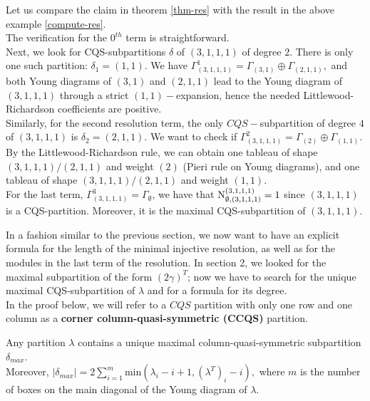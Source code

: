 \documentclass[main.tex]{subfiles}
\begin{document}
\begin{ex}
    \label{ex-resolution-proof-nr}
    Let us compare the claim in theorem \ref{thm-res} with the result in the above example \ref{compute-res}.  \\

    The verification for the $0^{th}$ term is straightforward. \\ 
    
    Next, we look for CQS-subpartitions $\delta$ of $(3,1,1,1)$ of degree $2.$ There is only one such partition: $\delta_1=(1,1).$ We have $\Gamma_{(3,1,1,1)}^1 = \Gamma_{(3,1)}\oplus \Gamma_{(2,1,1)},$ and both Young diagrams of $(3,1)$ and $(2,1,1)$ lead to the Young diagram of $(3,1,1,1)$ through a strict $(1,1)-$expansion, hence the needed Littlewood-Richardson coefficients are positive. \\ 
    
    Similarly, for the second resolution term, the only $CQS-$subpartition of degree $4$ of $(3,1,1,1)$ is $\delta_2 = (2,1,1)$. We want to check if $\Gamma_{(3,1,1,1)}^2 = \Gamma_{(2)} \oplus \Gamma_{(1,1)}$. By the Littlewood-Richardson rule, we can obtain one tableau of shape $(3,1,1,1)/(2,1,1)$ and weight $(2)$ (Pieri rule on Young diagrams), and one tableau of shape $(3,1,1,1)/(2,1,1)$ and weight $(1,1)$.\\
    
    For the last term, $\Gamma_{(3,1,1,1)}^{3}=\Gamma_{\emptyset}$, we have that $\text{N}^{(3,1,1,1)}_{\emptyset, (3,1,1,1)}=1$ since $(3,1,1,1)$ is a CQS-partition. Moreover, it is the maximal CQS-subpartition of $(3,1,1,1)$.
\end{ex}

\bigskip

In a fashion similar to the previous section, we now want to have an explicit formula for the length of the minimal injective resolution, as well as for the modules in the last term of the resolution. In section 2, we looked for the maximal subpartition of the form $(2\gamma)^T$; now we have to search for the unique maximal CQS-subpartition of $\lambda$ and for a formula for its degree. \\

In the proof below, we will refer to a $CQS$ partition with only one row and one column as a \textbf{corner column-quasi-symmetric (CCQS)} partition.

\bigskip
\begin{prop}
    \label{prop-maximal-cqs}
    Any partition $\lambda$ contains a unique maximal column-quasi-symmetric subpartition $\delta_{max}.$\\
    Moreover, $|\delta_{max}|=2\sum\limits_{i=1}^{m} \text{min} (\lambda_i-i+1, (\lambda^T)_i-i),$ where $m$ is the number of boxes on the main diagonal of the Young diagram of $\lambda$.
\end{prop}
\end{document}
